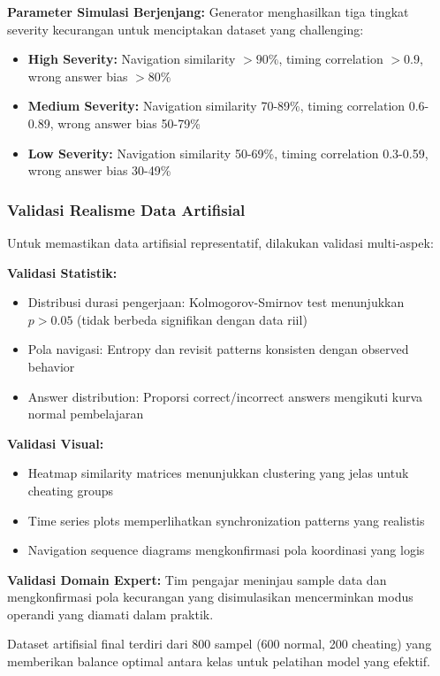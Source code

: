 \textbf{Parameter Simulasi Berjenjang:}
Generator menghasilkan tiga tingkat severity kecurangan untuk menciptakan dataset yang challenging:
\begin{itemize}
    \item \textbf{High Severity:} Navigation similarity $>90\%$, timing correlation $>0.9$, wrong answer bias $>80\%$
    \item \textbf{Medium Severity:} Navigation similarity 70-89\%, timing correlation 0.6-0.89, wrong answer bias 50-79\%
    \item \textbf{Low Severity:} Navigation similarity 50-69\%, timing correlation 0.3-0.59, wrong answer bias 30-49\%
\end{itemize}

\subsubsection{Validasi Realisme Data Artifisial}
\label{sec:validasiRealismeArtifisial}

Untuk memastikan data artifisial representatif, dilakukan validasi multi-aspek:

\textbf{Validasi Statistik:}
\begin{itemize}
    \item Distribusi durasi pengerjaan: Kolmogorov-Smirnov test menunjukkan $p>0.05$ (tidak berbeda signifikan dengan data riil)
    \item Pola navigasi: Entropy dan revisit patterns konsisten dengan observed behavior
    \item Answer distribution: Proporsi correct/incorrect answers mengikuti kurva normal pembelajaran
\end{itemize}

\textbf{Validasi Visual:}
\begin{itemize}
    \item Heatmap similarity matrices menunjukkan clustering yang jelas untuk cheating groups
    \item Time series plots memperlihatkan synchronization patterns yang realistis
    \item Navigation sequence diagrams mengkonfirmasi pola koordinasi yang logis
\end{itemize}

\textbf{Validasi Domain Expert:}
Tim pengajar meninjau sample data dan mengkonfirmasi pola kecurangan yang disimulasikan mencerminkan modus operandi yang diamati dalam praktik.

Dataset artifisial final terdiri dari 800 sampel (600 normal, 200 cheating) yang memberikan balance optimal antara kelas untuk pelatihan model yang efektif.

